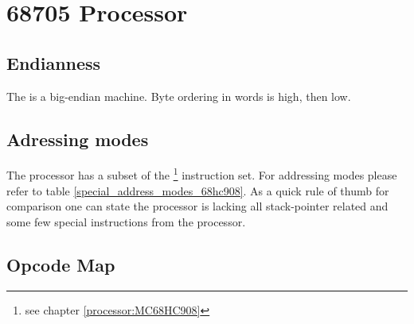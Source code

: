 \chapter{68705 Processor}
\label{processor:68705}

\section{Endianness}

The  is a big-endian machine. Byte ordering in words is high, then low.


\section{Adressing modes}

The  processor has a subset of the \footnote{see chapter \ref{processor:MC68HC908}} instruction set. 
For addressing modes please refer to table \ref{special_address_modes_68hc908}. As a quick 
rule of thumb for comparison one can state the  processor is lacking all stack-pointer related 
and some few special instructions from the  processor.

\section{Opcode Map}

%
\begin{landscape}%
{%
}%
\end{landscape}%
\restoregeometry     %

